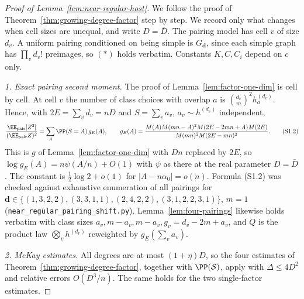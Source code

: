 \begin{proof}[Proof of Lemma~\ref{lem:near-regular-host}]
We follow the proof of Theorem~\ref{thm:growing-degree-factor} step by
step. We record only what changes when cell sizes are unequal, and write
\(D=\bar D\). The pairing model has cell \(v\) of size \(d_v\). A
uniform pairing conditioned on being simple is \(G_{\mathbf d}\), since each simple
graph has \(\prod_vd_v!\) preimages, so \((\ast)\) holds verbatim. Constants
\(K,C,C_i\) depend on \(c\) only.

\emph{1. Exact pairing second moment.} The proof of
Lemma~\ref{lem:factor-one-dim} is cell by cell. At cell \(v\) the
number of class choices with overlap \(a\) is \(\binom{d_v}{m}^2h^{(d_v)}_a\). Hence, with
\(2E=\sum_vd_v=nD\) and \(S=\sum_va_v\), \(a_v\sim h^{(d_v)}\) independent,
\[
\frac{\EE_{\mathrm{pair}}[Z^2]}{(\EE_{\mathrm{pair}}Z)^2}
=\sum_A\PP(S=A)\,g_E(A),
\qquad
g_E(A)=\frac{M(A)M(mn-A)^2M(2E-2mn+A)M(2E)}{M(mn)^2M(2E-mn)^2}.
\tag{S1.2}
\]
This is \(g\) of Lemma~\ref{lem:factor-one-dim} with \(Dn\) replaced by \(2E\), so
\(\log g_E(A)=n\psi(A/n)+O(1)\) with \(\psi\) as there at the real parameter
\(D=\bar D\). The constant is \(\tfrac12\log2+o(1)\) for
\(\lvert A-n\alpha_0\rvert=o(n)\). Formula (S1.2) was checked against exhaustive
enumeration of all pairings for \(\mathbf d\in\{(1,3,2,2),(3,3,1,1),(2,4,2,2),(3,1,2,2,3,1)\}\),
\(m=1\) (\texttt{near\_regular\_pairing\_shift.py}).
Lemma~\ref{lem:four-pairings} likewise holds verbatim with class sizes
\(a_v,m-a_v,m-a_v,g_v=d_v-2m+a_v\), and \(Q\) is the product law
\(\bigotimes_vh^{(d_v)}\) reweighted by \(g_E(\sum_va_v)\).

\emph{2. McKay estimates.} All degrees are at most \((1+\eta)D\), so the four
estimates of Theorem~\ref{thm:growing-degree-factor}, together with \(\PP(\mathcal S)\), apply
with \(\hat\Delta\le4D^2\) and relative errors \(O(D^3/n)\). The same holds for
the two single-factor estimates.


\end{proof}
